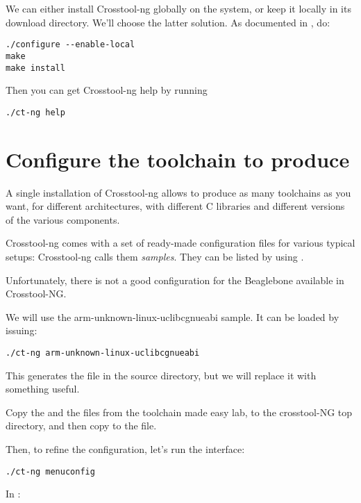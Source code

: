 We can either install Crosstool-ng globally on the system, or keep it
locally in its download directory. We'll choose the latter
solution. As documented in
, do:

\begin{verbatim}
./configure --enable-local
make
make install
\end{verbatim}

Then you can get Crosstool-ng help by running

\begin{verbatim}
./ct-ng help
\end{verbatim}

\section{Configure the toolchain to produce}

A single installation of Crosstool-ng allows to produce as many
toolchains as you want, for different architectures, with different C
libraries and different versions of the various components.

Crosstool-ng comes with a set of ready-made configuration files for
various typical setups: Crosstool-ng calls them {\em samples}. They can be
listed by using .

Unfortunately, there is not a good configuration for the Beaglebone available in Crosstool-NG.

We will use the arm-unknown-linux-uclibcgnueabi sample. It can be loaded by issuing:

\begin{verbatim}
./ct-ng arm-unknown-linux-uclibcgnueabi
\end{verbatim}

This generates the  file in the source directory, but we will replace it with
something useful.

Copy the  and the  files from the toolchain made easy lab, to the crosstool-NG top directory, and then copy  to the  file.

Then, to refine the configuration, let's run the  interface:

\begin{verbatim}
./ct-ng menuconfig
\end{verbatim}

In :

